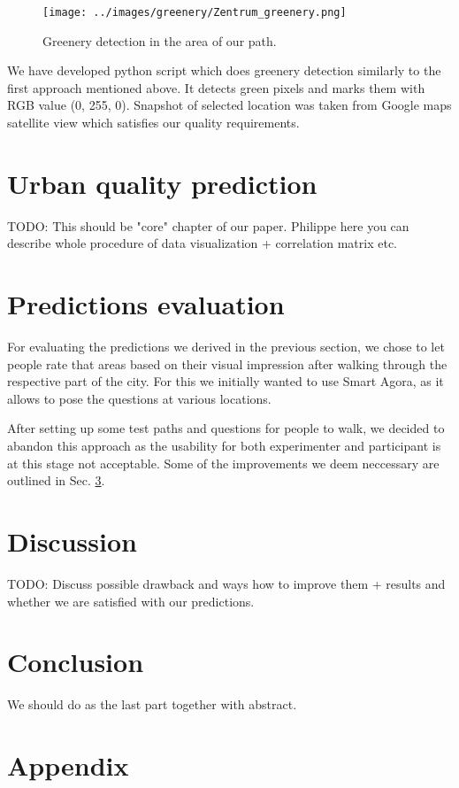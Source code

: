 \documentclass[letterpaper]{article}
\begin{document}
\begin{figure}[htb]
 	\centering
 	\texttt{[image: ../images/greenery/Zentrum\_greenery.png]}
 	\caption{Greenery detection in the area of our path.}
 	\label{fig:path_greenery}
 \end{figure}

\indent We have developed python script which does greenery detection similarly to the first approach mentioned above. It detects green pixels and marks them with RGB value (0, 255, 0). Snapshot of selected location was taken from Google maps satellite view which satisfies our quality requirements.  %

\section{Urban quality prediction}\label{sec:predictions}
TODO: This should be "core" chapter of our paper. Philippe here you can describe whole procedure of data visualization + correlation matrix etc.

\section{Predictions evaluation}\label{sec:exp}
For evaluating the predictions we derived in the previous section, we chose to let people rate that areas based on their visual impression after walking through the respective part of the city. For this we initially wanted to use Smart Agora, as it allows to pose the questions at various locations.

After setting up some test paths and questions for people to walk, we decided to abandon this approach as the usability for both experimenter and participant is at this stage not acceptable. Some of the improvements we deem neccessary are outlined in Sec. \ref{sec:discussion}.

\section{Discussion}\label{sec:discussion}
TODO: Discuss possible drawback and ways how to improve them + results and whether we are satisfied with our predictions.

\section{Conclusion}\label{sec:conclusion}
We should do as the last part together with abstract.




\section{Appendix}
\end{document}
